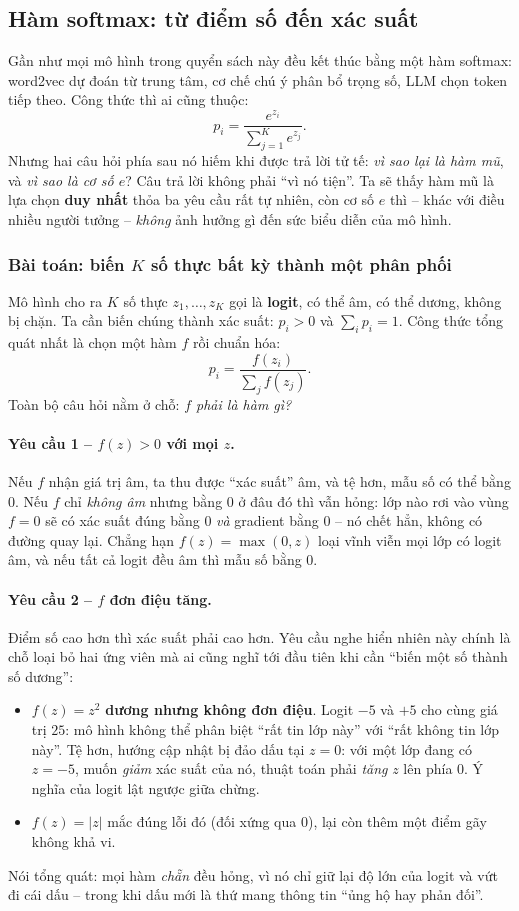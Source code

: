 \subsection{Hàm softmax: từ điểm số đến xác suất}
\label{ssec:softmax}

Gần như mọi mô hình trong quyển sách này đều kết thúc bằng một hàm softmax: word2vec dự đoán từ trung tâm, cơ chế chú ý phân bổ trọng số, LLM chọn token tiếp theo. Công thức thì ai cũng thuộc:
\[
p_i = \frac{e^{z_i}}{\sum_{j=1}^{K} e^{z_j}} .
\]
Nhưng hai câu hỏi phía sau nó hiếm khi được trả lời tử tế: \emph{vì sao lại là hàm mũ}, và \emph{vì sao là cơ số $e$}? Câu trả lời không phải “vì nó tiện”. Ta sẽ thấy hàm mũ là lựa chọn \textbf{duy nhất} thỏa ba yêu cầu rất tự nhiên, còn cơ số $e$ thì -- khác với điều nhiều người tưởng -- \emph{không} ảnh hưởng gì đến sức biểu diễn của mô hình.

\subsubsection{Bài toán: biến $K$ số thực bất kỳ thành một phân phối}
Mô hình cho ra $K$ số thực $z_1, \dots, z_K$ gọi là \textbf{logit}, có thể âm, có thể dương, không bị chặn. Ta cần biến chúng thành xác suất: $p_i > 0$ và $\sum_i p_i = 1$. Công thức tổng quát nhất là chọn một hàm $f$ rồi chuẩn hóa:
\[
p_i = \frac{f(z_i)}{\sum_{j} f(z_j)} .
\]
Toàn bộ câu hỏi nằm ở chỗ: \emph{$f$ phải là hàm gì?}

\paragraph{Yêu cầu 1 -- $f(z) > 0$ với mọi $z$.} Nếu $f$ nhận giá trị âm, ta thu được “xác suất” âm, và tệ hơn, mẫu số có thể bằng $0$. Nếu $f$ chỉ \emph{không âm} nhưng bằng $0$ ở đâu đó thì vẫn hỏng: lớp nào rơi vào vùng $f = 0$ sẽ có xác suất đúng bằng $0$ \emph{và} gradient bằng $0$ -- nó chết hẳn, không có đường quay lại. Chẳng hạn $f(z) = \max(0, z)$ loại vĩnh viễn mọi lớp có logit âm, và nếu tất cả logit đều âm thì mẫu số bằng $0$.

\paragraph{Yêu cầu 2 -- $f$ đơn điệu tăng.} Điểm số cao hơn thì xác suất phải cao hơn. Yêu cầu nghe hiển nhiên này chính là chỗ loại bỏ hai ứng viên mà ai cũng nghĩ tới đầu tiên khi cần “biến một số thành số dương”:
\begin{itemize}
    \item $f(z) = z^2$ \textbf{dương nhưng không đơn điệu}. Logit $-5$ và $+5$ cho cùng giá trị $25$: mô hình không thể phân biệt “rất tin lớp này” với “rất không tin lớp này”. Tệ hơn, hướng cập nhật bị đảo dấu tại $z = 0$: với một lớp đang có $z = -5$, muốn \emph{giảm} xác suất của nó, thuật toán phải \emph{tăng} $z$ lên phía $0$. Ý nghĩa của logit lật ngược giữa chừng.
    \item $f(z) = |z|$ mắc đúng lỗi đó (đối xứng qua $0$), lại còn thêm một điểm gãy không khả vi.
\end{itemize}
Nói tổng quát: mọi hàm \emph{chẵn} đều hỏng, vì nó chỉ giữ lại độ lớn của logit và vứt đi cái dấu -- trong khi dấu mới là thứ mang thông tin “ủng hộ hay phản đối”.

